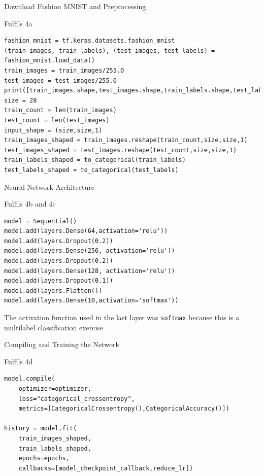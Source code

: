 \documentclass[12pt, letterpaper]{article}
\begin{document}
{\large Download Fashion MNIST and Preprocessing}

Fulfils 4a

\begin{mdframed}[backgroundcolor=bg]
\begin{verbatim}
fashion_mnist = tf.keras.datasets.fashion_mnist
(train_images, train_labels), (test_images, test_labels) = fashion_mnist.load_data()
train_images = train_images/255.0
test_images = test_images/255.0
print([train_images.shape,test_images.shape,train_labels.shape,test_labels.shape])
size = 28
train_count = len(train_images)
test_count = len(test_images)
input_shape = (size,size,1)
train_images_shaped = train_images.reshape(train_count,size,size,1)
test_images_shaped = test_images.reshape(test_count,size,size,1)
train_labels_shaped = to_categorical(train_labels)
test_labels_shaped = to_categorical(test_labels)
\end{verbatim}
\end{mdframed}

{\large Neural Network Architecture}

Fulfils 4b and 4c
\begin{mdframed}[backgroundcolor=bg]
\begin{verbatim}
model = Sequential()
model.add(layers.Dense(64,activation='relu'))
model.add(layers.Dropout(0.2))
model.add(layers.Dense(256, activation='relu'))
model.add(layers.Dropout(0.2))
model.add(layers.Dense(128, activation='relu'))
model.add(layers.Dropout(0.1))
model.add(layers.Flatten())
model.add(layers.Dense(10,activation='softmax'))
\end{verbatim}
\end{mdframed}

The activation function used in the last layer was \texttt{softmax} 
because this is a multilabel classification exercise

{\large Compiling and Training the Network}

Fulfils 4d

\begin{mdframed}[backgroundcolor=bg]
\begin{verbatim}
model.compile(
    optimizer=optimizer,
    loss="categorical_crossentropy",
    metrics=[CategoricalCrossentropy(),CategoricalAccuracy()])

history = model.fit(
    train_images_shaped,
    train_labels_shaped,
    epochs=epochs,
    callbacks=[model_checkpoint_callback,reduce_lr])
\end{verbatim}
\end{mdframed}
\end{document}
